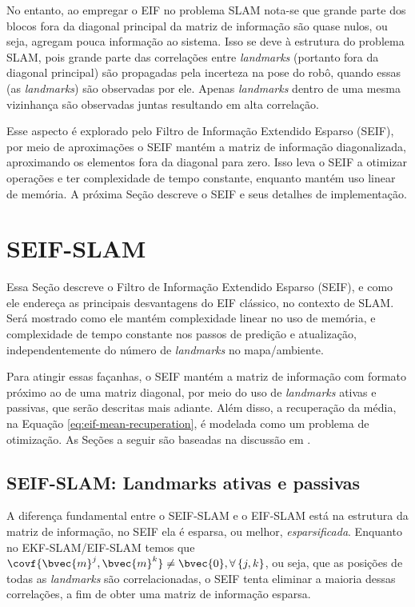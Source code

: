 No entanto, ao empregar o EIF no problema SLAM nota-se que grande parte dos 
blocos fora da diagonal principal da matriz de informação são quase nulos, ou 
seja, agregam pouca informação ao sistema. Isso se deve à estrutura do problema 
SLAM, pois grande parte das correlações entre \textit{landmarks} (portanto 
fora da diagonal principal) são propagadas pela incerteza na pose do robô, 
quando essas (as \textit{landmarks}) são observadas por ele. Apenas 
\textit{landmarks} dentro de uma mesma vizinhança são observadas juntas 
resultando em alta correlação.

Esse aspecto é explorado pelo Filtro de Informação Extendido Esparso (SEIF), 
por meio de aproximações o SEIF mantém a matriz de informação diagonalizada, 
aproximando os elementos fora da diagonal para zero. Isso leva o SEIF a otimizar 
operações e ter complexidade de tempo constante, enquanto mantém uso linear de 
memória. A próxima Seção descreve o SEIF e seus detalhes de implementação.

\section{SEIF-SLAM}
Essa Seção descreve o Filtro de Informação Extendido Esparso (SEIF), e 
como ele endereça as principais desvantagens do EIF clássico, no 
contexto de SLAM. Será mostrado como ele mantém complexidade 
linear no uso de memória, e complexidade de tempo constante nos passos de predição e atualização, independentemente do número de 
\textit{landmarks} no mapa/ambiente.

Para atingir essas façanhas, o SEIF mantém a matriz de informação 
com formato próximo ao de uma matriz diagonal, por meio do uso de 
\textit{landmarks} ativas e passivas, que serão descritas mais adiante. 
Além disso, a recuperação da média, na Equação 
\ref{eq:eif-mean-recuperation}, é modelada como um problema de 
otimização. As Seções a seguir são baseadas na discussão em \cite[Capítulo~12.4]{bongard2006probabilistic}.

\subsection{SEIF-SLAM: Landmarks ativas e passivas}
A diferença fundamental entre o SEIF-SLAM e o EIF-SLAM está na estrutura da matriz de informação, no SEIF ela é esparsa, ou melhor, 
\emph{esparsificada}. Enquanto no EKF-SLAM/EIF-SLAM temos 
que $\covf{\bvec{m}^j, \bvec{m}^k} \neq \bvec{0}, 
\forall\, \{j,k\}$, ou seja, que as posições de todas as 
\textit{landmarks} são correlacionadas, o SEIF tenta eliminar a maioria 
dessas correlações, a fim de obter uma matriz de informação esparsa.

